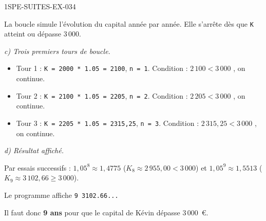 \begin{corrige}{1SPE-SUITES-EX-034}
\medskip


La boucle simule l'évolution du capital année par année. Elle s'arrête dès que \texttt{K} atteint ou dépasse $3\,000$.

\textit{c) Trois premiers tours de boucle.}

\begin{itemize}
  \item Tour 1 : \texttt{K = 2000 * 1.05 = 2100}, \texttt{n = 1}. Condition : $2\,100 < 3\,000$ \checkmark, on continue.
  \item Tour 2 : \texttt{K = 2100 * 1.05 = 2205}, \texttt{n = 2}. Condition : $2\,205 < 3\,000$ \checkmark, on continue.
  \item Tour 3 : \texttt{K = 2205 * 1.05 = 2315,25}, \texttt{n = 3}. Condition : $2\,315{,}25 < 3\,000$ \checkmark, on continue.
\end{itemize}

\textit{d) Résultat affiché.}

Par essais successifs : $1{,}05^8 \approx 1{,}4775$ ($K_8 \approx 2\,955{,}00 < 3\,000$) et $1{,}05^9 \approx 1{,}5513$ ($K_9 \approx 3\,102{,}66 \geq 3\,000$).


Le programme affiche \texttt{9 3102.66...}

Il faut donc \textbf{9 ans} pour que le capital de Kévin dépasse $3\,000$~\euro{}.

\end{corrige}
